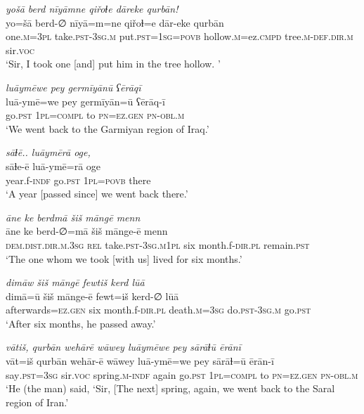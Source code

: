 \ea \label{ZQ.26}
\textit{yošā berd nīyāmne qiřoɫe dāreke qurbān!} \\ 
\gll yo=šā berd-∅ nīyā=m=ne qiřoɫ=e dār-eke qurbān \\ 
 one\textsc{.m}\textsc{=3pl} take\textsc{.pst}\textsc{-3sg}\textsc{.m} put\textsc{.pst}\textsc{=\textsc{1sg}}\textsc{=\textsc{povb}} hollow\textsc{.m}=ez\textsc{.cmpd} tree\textsc{.m}\textsc{-def}\textsc{.dir}\textsc{.m} sir.\textsc{voc} \\ 
\glt `Sir, I took one [and] put him in the tree hollow. '
\z 
 
\ea \label{ZQ.27}
\textit{luāymēwe pey germīyānū ʕērāqī} \\ 
\gll luā-ymē=we pey germīyān=ū ʕērāq-ī \\ 
 go\textsc{.pst} \textsc{1pl}\textsc{=compl} to \textsc{pn}\textsc{=ez.gen} \textsc{pn}\textsc{-obl}\textsc{.m} \\ 
\glt `We went back to the Garmiyan region of Iraq.'
\z 
 
\ea \label{ZQ.28}
\textit{sāɫē.. luāymērā oge,} \\ 
\gll sāɫe-ē luā-ymē=rā oge \\ 
 year.f\textsc{-indf} go\textsc{.pst} \textsc{1pl}\textsc{=\textsc{povb}} there \\ 
\glt `A year [passed since] we went back there.'
\z 
 
\ea \label{ZQ.29}
\textit{āne ke berdmā šiš māngē menn} \\ 
\gll āne ke berd-∅=mā šiš mānge-ē menn \\ 
 \textsc{dem.dist}\textsc{.dir}\textsc{.m}\textsc{.3sg} \textsc{rel} take\textsc{.pst}\textsc{-3sg}\textsc{.m}\textsc{1pl} six month.f\textsc{-dir}\textsc{.pl} remain\textsc{.pst} \\ 
\glt `The one whom we took [with us] lived for six months.'
\z 
 
\ea \label{ZQ.30}
\textit{dimāw šiš māngē fewtiš kerd lūā} \\ 
\gll dimā=ū šiš mānge-ē fewt=iš kerd-∅ lūā \\ 
 afterwards\textsc{=ez.gen} six month.f\textsc{-dir}\textsc{.pl} death\textsc{.m}\textsc{=3sg} do\textsc{.pst}\textsc{-3sg}\textsc{.m} go\textsc{.pst} \\ 
\glt `After six months, he passed away.'
\z 
 
\ea \label{ZQ.33}
\textit{vātiš, qurbān wehārē wāwey luāymēwe pey sārāɫū ērānī} \\ 
\gll vāt=iš qurbān wehār-ē wāwey luā-ymē=we pey sārāɫ=ū ērān-ī \\ 
 say\textsc{.pst}\textsc{=3sg} sir.\textsc{voc} spring\textsc{.m}\textsc{-indf} again go\textsc{.pst} \textsc{1pl}\textsc{=compl} to \textsc{pn}\textsc{=ez.gen} \textsc{pn}\textsc{-obl}\textsc{.m} \\ 
\glt `He (the man) said, ‘Sir, [The next] spring, again, we went back to the Saral region of Iran.'
\z 
 
